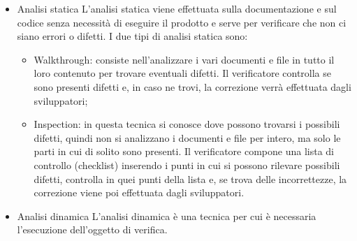         \begin{itemize}
            \item Analisi statica
                L'analisi statica viene effettuata sulla documentazione e sul codice senza necessità di eseguire il prodotto e serve per verificare che non ci siano errori o difetti. I due tipi di analisi statica sono:
                \begin{itemize}
                    \item Walkthrough: consiste nell'analizzare i vari documenti e file in tutto il loro contenuto per trovare eventuali difetti. Il verificatore controlla se sono presenti difetti e, in caso ne trovi, la correzione verrà effettuata dagli sviluppatori; 
                    \item Inspection: in questa tecnica si conosce dove possono trovarsi i possibili difetti, quindi non si analizzano i documenti e file per intero, ma solo le parti in cui di solito sono presenti. Il verificatore compone una lista di controllo (checklist) inserendo i punti in cui si possono rilevare possibili difetti, controlla in quei punti della lista e, se trova delle incorrettezze, la correzione viene poi effettuata dagli sviluppatori.
                \end{itemize}
            \item Analisi dinamica
				L'analisi dinamica è una tecnica per cui è necessaria l'esecuzione dell'oggetto di verifica.
        \end{itemize}
        

